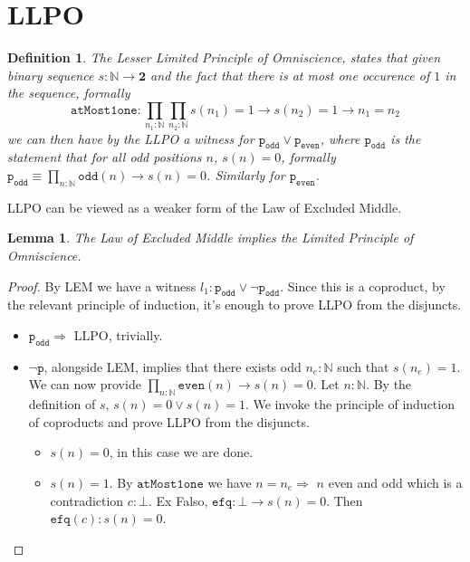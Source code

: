 \documentclass[12pt]{article}
\newtheorem{defn}[thm]{Definition}
\newtheorem{lem}[thm]{Lemma}
\begin{document}
\section{LLPO}
\begin{defn} 
The Lesser Limited Principle of Omniscience, states that given binary sequence $s : \mathbb{N} \rightarrow \mathbf{2}$ and the fact that there is at most one occurence of $1$ in the sequence, formally 
$$\mathtt{atMost1one} :\prod_{n_1 : \mathbb{N}} \prod_{n_2 : \mathbb{N}} s(n_1) = 1 \rightarrow s(n_2)= 1 \rightarrow n_1 = n_2$$
we can then have by the LLPO a witness for $\mathtt{p_{odd}} \vee \mathtt{p_{even}}$, where $\mathtt{p_{odd}}$ is the statement that for all odd positions $n$, $s(n) = 0$, formally $\mathtt{p_{odd}} \equiv \prod_{n : \mathbb{N}} \mathtt{odd}(n) \rightarrow s(n) = 0$. 
Similarly for $\mathtt{p_{even}}$. 
\end{defn}
LLPO can be viewed as a weaker form of the Law of Excluded Middle. 

\begin{lem} 
The Law of Excluded Middle implies the Limited Principle of Omniscience.
\end{lem}

\begin{proof}
By LEM we have a witness $ l_1 :\mathtt{p_{odd}} \vee \neg \mathtt{p_{odd}}$. 
Since this is a coproduct, by the relevant principle of induction, it's enough to prove LLPO from the disjuncts. 
\begin{itemize}
	\item $\mathtt{p_{odd}} \Rightarrow $ LLPO, trivially.

	\item $\neg \mathtt{p}$, alongside LEM, implies that there exists odd $n_e : \mathbb{N}$ such that $s(n_e) = 1$. 
	We can now provide $\prod_{n : \mathbb{N}} \mathtt{even}(n) \rightarrow s(n) = 0$. 
	Let $n : \mathbb{N}$. 
	By the definition of $s$, $s(n) = 0 \vee s(n) = 1$.
	We invoke the principle of induction of coproducts and prove LLPO from the disjuncts. 
	\begin{itemize}
		\item $s(n) = 0$, in this case we are done.
		\item $s(n) = 1$. 
		By $\mathtt{atMost1one}$ we have $n = n_e \Rightarrow $ $n$ even and odd which is a contradiction $c : \bot$. 
		Ex Falso,  $\mathtt{efq} : \bot \rightarrow s(n) = 0$. 
		Then $\mathtt{efq}(c) : s(n) = 0$.
	\end{itemize}

\end{itemize}


\end{proof}
\end{document}

